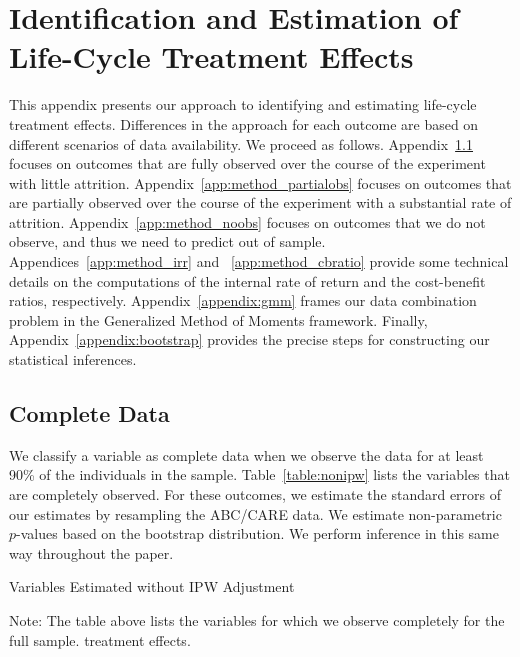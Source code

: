 \section{Identification and Estimation of Life-Cycle Treatment Effects} \label{appendix:methodology}

This appendix presents our approach to identifying and estimating life-cycle treatment effects. Differences in the approach for each outcome are based on different scenarios of data availability. We proceed as follows. Appendix~\ref{app:method_fullobs} focuses on outcomes that are fully observed over the course of the experiment with little attrition. Appendix~\ref{app:method_partialobs} focuses on outcomes that are partially observed over the course of the experiment with a substantial rate of attrition. Appendix~\ref{app:method_noobs}  focuses on outcomes that we do not observe, and thus we need to predict out of sample. Appendices~\ref{app:method_irr} and ~\ref{app:method_cbratio} provide some technical details on the computations of the internal rate of return and the cost-benefit ratios, respectively. Appendix~\ref{appendix:gmm} frames our data combination problem in the Generalized Method of Moments framework. Finally, Appendix~\ref{appendix:bootstrap} provides the precise steps for constructing our statistical inferences.

\subsection{Complete Data}\label{app:method_fullobs}

We classify a variable as complete data when we observe the data for at least 90\% of the individuals in the sample. Table~\ref{table:nonipw} lists the variables that are completely observed. For these outcomes, we estimate the standard errors of our estimates by resampling the ABC/CARE data. We estimate non-parametric $p$-values based on the bootstrap distribution. We perform inference in this same way throughout the paper.

\begin{table}[H]
\begin{threeparttable}
\caption{Variables Estimated without IPW Adjustment}
\label{table:nonipw}
\centering

\begin{tablenotes}
\footnotesize
\item Note: The table above lists the variables for which we observe completely for the full sample.
treatment effects.
\end{tablenotes}
\end{threeparttable}
\end{table}

